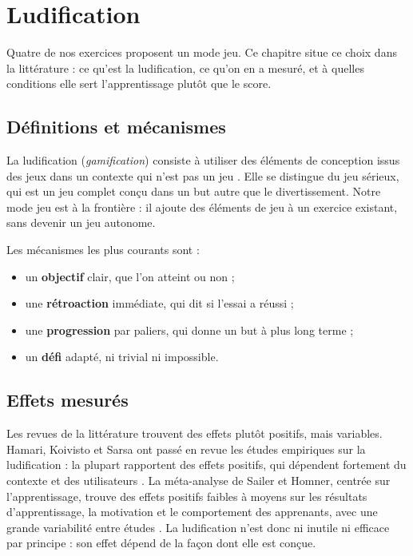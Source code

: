 
\chapter{Ludification}\label{chap:ludification}

Quatre de nos exercices proposent un mode jeu. Ce chapitre situe ce choix dans
la littérature : ce qu'est la ludification, ce qu'on en a mesuré, et à quelles
conditions elle sert l'apprentissage plutôt que le score.

\section{Définitions et mécanismes}

La ludification (\emph{gamification}) consiste à utiliser des éléments de
conception issus des jeux dans un contexte qui n'est pas un jeu
\cite{deterding2011}. Elle se distingue du jeu sérieux, qui est un jeu
complet conçu dans un but autre que le divertissement. Notre mode jeu est à
la frontière : il ajoute des éléments de jeu à un exercice existant, sans
devenir un jeu autonome.

Les mécanismes les plus courants sont :
\begin{itemize}
  \item un \textbf{objectif} clair, que l'on atteint ou non ;
  \item une \textbf{rétroaction} immédiate, qui dit si l'essai a réussi ;
  \item une \textbf{progression} par paliers, qui donne un but à plus long
        terme ;
  \item un \textbf{défi} adapté, ni trivial ni impossible.
\end{itemize}

\section{Effets mesurés}

Les revues de la littérature trouvent des effets plutôt positifs, mais
variables. Hamari, Koivisto et Sarsa ont passé en revue les études empiriques
sur la ludification : la plupart rapportent des effets positifs, qui
dépendent fortement du contexte et des utilisateurs \cite{hamari2014}. La
méta-analyse de Sailer et Homner, centrée sur l'apprentissage, trouve des
effets positifs faibles à moyens sur les résultats d'apprentissage, la
motivation et le comportement des apprenants, avec une grande variabilité
entre études \cite{sailer2020}. La ludification n'est donc ni inutile ni
efficace par principe : son effet dépend de la façon dont elle est conçue.

